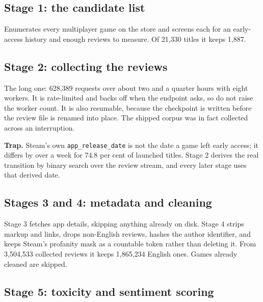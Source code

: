 \subsection*{Stage 1: the candidate list}

Enumerates every multiplayer game on the store and screens each for an early-access history and
enough reviews to measure. Of 21,330 titles it keeps 1,887.

\subsection*{Stage 2: collecting the reviews}

The long one: 628,389 requests over about two and a quarter hours with eight workers. It is
rate-limited and backs off when the endpoint asks, so do not raise the worker count. It is also
resumable, because the checkpoint is written before the review file is renamed into place. The
shipped corpus was in fact collected across an interruption.



\textbf{Trap.} Steam's own \texttt{app\_release\_date} is not the date a game left early access; it
differs by over a week for 74.8 per cent of launched titles. Stage 2 derives the real transition by
binary search over the review stream, and every later stage uses that derived date.

\subsection*{Stages 3 and 4: metadata and cleaning}

Stage 3 fetches app details, skipping anything already on disk. Stage 4 strips markup and links,
drops non-English reviews, hashes the author identifier, and keeps Steam's profanity mask as a
countable token rather than deleting it. From 3,504,533 collected reviews it keeps 1,865,234
English ones. Games already cleaned are skipped.


\subsection*{Stage 5: toxicity and sentiment scoring}

